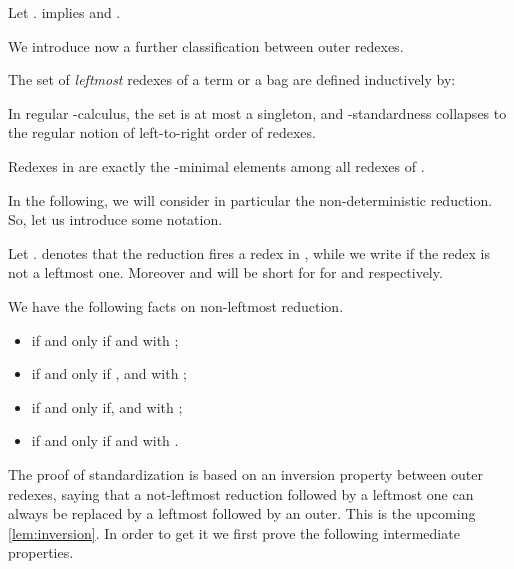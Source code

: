 \begin{theorem}\label{the:patra}
Let .  implies  and .
\end{theorem}

We introduce now a further classification between outer redexes.
\begin{definition}
The set of \emph{leftmost} redexes  of a term  or a bag  are defined
  inductively by:
  
\end{definition}

In regular -calculus, the set  is at most a singleton, and
-standardness collapses to the regular notion of left-to-right order of redexes.

\begin{fact}
  Redexes in  are exactly the -minimal elements among
  all redexes of .
\end{fact}

In the following, we will consider in particular the non-deterministic reduction. So, let us introduce some notation.

\begin{notation}
Let .
 denotes that the reduction fires a
redex in , while we write  if the redex
is not a leftmost one. Moreover  and  will be short for 
for  and  respectively.

\end{notation}

\begin{lemma}\label{lem:rightpushing}
We have the following facts on non-leftmost reduction.
\begin{itemize}
\item  if and only if 
  and  with ;
\item  if and only if ,  and  with ;
\item   if and only if,
   and 
  with ;
\item   if and only if and  with .
\end{itemize}
\end{lemma}
The proof of standardization is based on an inversion property between outer redexes,
saying that a not-leftmost reduction followed by a leftmost one can always be replaced by a leftmost followed by 
an outer. This is the upcoming \autoref{lem:inversion}. In order to get it we first prove the following intermediate properties.

